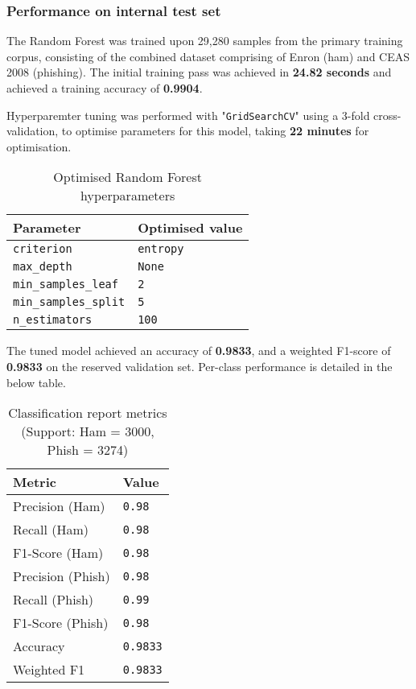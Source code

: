 
\subsubsection*{Performance on internal test set}
The Random Forest was trained upon 29,280 samples from the primary training corpus, consisting of the combined dataset comprising of Enron (ham) and CEAS 2008 (phishing). The initial training pass was achieved in \textbf{24.82 seconds} and achieved a training accuracy of \textbf{0.9904}.\newline

\noindent Hyperparemter tuning was performed with "\texttt{GridSearchCV}" using a 3-fold cross-validation, to optimise parameters for this model, taking \textbf{22 minutes} for optimisation.

\begin{table}[h]
\centering
\begin{tabularx}{\textwidth}{|X|X|}
\hline
\textbf{Parameter} & \textbf{Optimised value} \\
\hline
\texttt{criterion} & \texttt{entropy} \\
\hline
\texttt{max\_depth} & \texttt{None} \\
\hline
\texttt{min\_samples\_leaf} & \texttt{2} \\
\hline
\texttt{min\_samples\_split} & \texttt{5} \\
\hline
\texttt{n\_estimators} & \texttt{100} \\
\hline
\end{tabularx}
\caption{Optimised Random Forest hyperparameters}
\end{table}

\noindent The tuned model achieved an accuracy of \textbf{0.9833}, and a weighted F1-score of \textbf{0.9833} on the reserved validation set. Per-class performance is detailed in the below table.

\begin{table}[h]
\centering
\begin{tabularx}{\textwidth}{|X|X|}
\hline
\textbf{Metric} & \textbf{Value} \\
\hline
Precision (Ham) & \texttt{0.98} \\
\hline
Recall (Ham) & \texttt{0.98} \\
\hline
F1-Score (Ham) & \texttt{0.98} \\
\hline
Precision (Phish) & \texttt{0.98} \\
\hline
Recall (Phish) & \texttt{0.99} \\
\hline
F1-Score (Phish) & \texttt{0.98} \\
\hline
Accuracy & \texttt{0.9833} \\
\hline
Weighted F1 & \texttt{0.9833} \\
\hline
\end{tabularx}
\caption{Classification report metrics (Support: Ham = 3000, Phish = 3274)}
\end{table}

